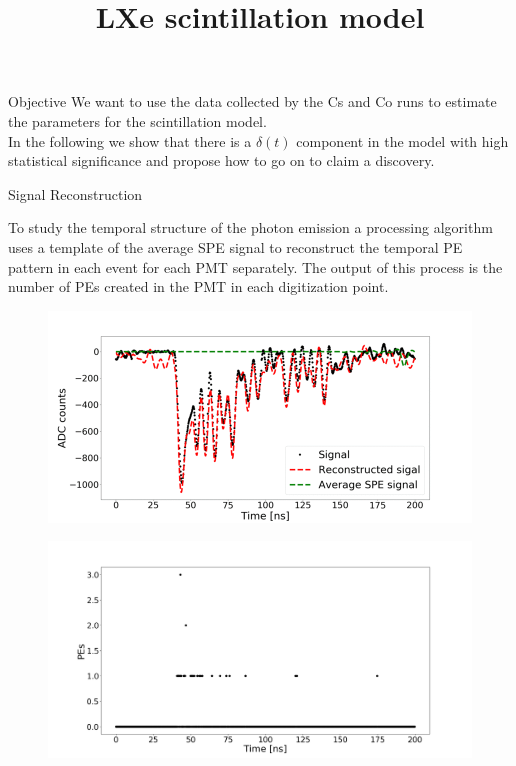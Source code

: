 \documentclass{beamer}
\title{LXe scintillation model}
\begin{document}
{ 
\frame{\titlepage}}

\begin{frame}{Objective}
We want to use the data collected by the Cs and Co runs to estimate the parameters for the scintillation model.\\
In the following we show that there is a $\delta(t)$ component in the model with high statistical significance and propose how to go on to claim a discovery. 
\end{frame}


\begin{frame}{Signal Reconstruction}
  
To study the temporal structure of the photon emission a processing algorithm uses a template of the average SPE signal to reconstruct the temporal PE pattern in each event for each PMT separately. The output of this process is the number of PEs created in the PMT in each digitization point.

\begin{figure}[h]
\includegraphics[width=0.5\linewidth]{recon-41.png}
\end{figure}

\begin{figure}[h]
\includegraphics[width=0.5\linewidth]{PEs.png}
\end{figure}
\end{frame}
\end{document}
